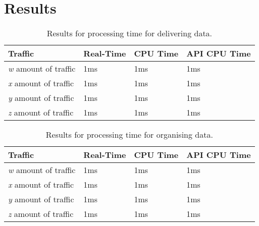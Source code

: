 \documentclass{article}
\begin{document}

\section{Results} %
\label{sec:results}


\begin{table*}[t]
\centering
\begin{tabular}{|p{}|p{}|p{}|p{}|}
\hline
{\bf Traffic} & {\bf Real-Time} & {\bf CPU Time} & {\bf API CPU Time} \\
\hline
\hline
\emph{w} amount of traffic
&
1ms
&
1ms
&
1ms
\\
\hline
\emph{x} amount of traffic
&
1ms
&
1ms
&
1ms
\\
\hline
\emph{y} amount of traffic
&
1ms
&
1ms
&
1ms
\\
\hline
\emph{z} amount of traffic
&
1ms
&
1ms
&
1ms
\\
\hline
\end{tabular}
\caption{Results for processing time for delivering data.}
\label{tab:data_delivery_results}
\end{table*}







\begin{table*}[t]
\centering
\begin{tabular}{|p{}|p{}|p{}|p{}|}
\hline
{\bf Traffic} & {\bf Real-Time} & {\bf CPU Time} & {\bf API CPU Time} \\
\hline
\hline
\emph{w} amount of traffic
&
1ms
&
1ms
&
1ms
\\
\hline
\emph{x} amount of traffic
&
1ms
&
1ms
&
1ms
\\
\hline
\emph{y} amount of traffic
&
1ms
&
1ms
&
1ms
\\
\hline
\emph{z} amount of traffic
&
1ms
&
1ms
&
1ms
\\
\hline
\end{tabular}
\caption{Results for processing time for organising data.}
\label{tab:data_organisation_results}
\end{table*}
\end{document}
